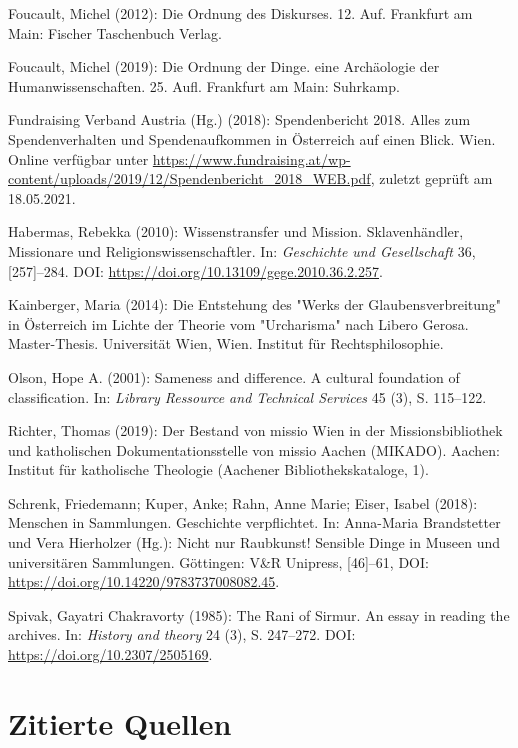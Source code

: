 \documentclass[a4paper,
fontsize=11pt,
oneside,
numbers=noperiodatend,
parskip=half-,
bibliography=totoc,
final
]{scrartcl}
\begin{document}
Foucault, Michel (2012): Die Ordnung des Diskurses. 12. Auf. Frankfurt
am Main: Fischer Taschenbuch Verlag.

Foucault, Michel (2019): Die Ordnung der Dinge. eine Archäologie der
Humanwissenschaften. 25. Aufl. Frankfurt am Main: Suhrkamp.

Fundraising Verband Austria (Hg.) (2018): Spendenbericht 2018. Alles zum
Spendenverhalten und Spendenaufkommen in Österreich auf einen Blick.
Wien. Online verfügbar unter  \url{https://www.fundraising.at/wp-content/uploads/2019/12/Spendenbericht\_2018\_WEB.pdf}, zuletzt \linebreak geprüft am 18.05.2021.

Habermas, Rebekka (2010): Wissenstransfer und Mission. Sklavenhändler,
Missionare und Religionswissenschaftler. In: \emph{Geschichte und
Gesellschaft} 36, {[}257{]}--284. DOI:
\url{https://doi.org/10.13109/gege.2010.36.2.257}.

Kainberger, Maria (2014): Die Entstehung des "Werks der
Glaubensverbreitung" in Österreich im Lichte der Theorie vom
"Urcharisma" nach Libero Gerosa. Master-Thesis. Universität Wien, Wien.
Institut für Rechtsphilosophie.

Olson, Hope A. (2001): Sameness and difference. A cultural foundation of
classification. In: \emph{Library Ressource and Technical Services} 45
(3), S. 115--122.

Richter, Thomas (2019): Der Bestand von missio Wien in der
Missionsbibliothek und katholischen Dokumentationsstelle von missio
Aachen (MIKADO). Aachen: Institut für katholische Theologie (Aachener
Bibliothekskataloge, 1).

Schrenk, Friedemann; Kuper, Anke; Rahn, Anne Marie; Eiser, Isabel
(2018): Menschen in Sammlungen. Geschichte verpflichtet. In: Anna-Maria
Brandstetter und Vera Hierholzer (Hg.): Nicht nur Raubkunst! Sensible
Dinge in Museen und universitären Sammlungen. Göttingen: V\&R Unipress,
{[}46{]}--61, DOI: \url{https://doi.org/10.14220/9783737008082.45}.

Spivak, Gayatri Chakravorty (1985): The Rani of Sirmur. An essay in
reading the archives. In: \emph{History and theory} 24 (3), S. 247--272.
DOI: \url{https://doi.org/10.2307/2505169}.

\hypertarget{zitierte-quellen}{%
\section{Zitierte Quellen}\label{zitierte-quellen}}
\end{document}

